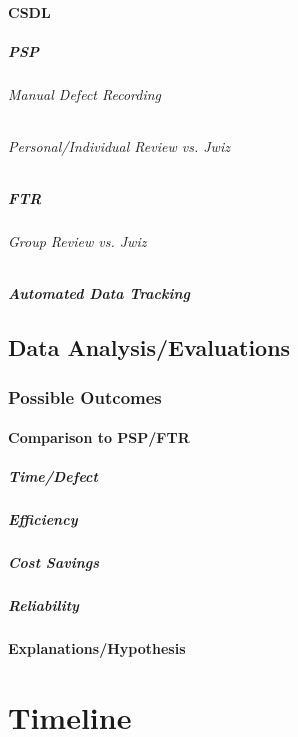 \subsubsection{CSDL}
\paragraph{PSP}
\subparagraph{Manual Defect Recording} \subparagraph{Personal/Individual
  Review vs. Jwiz}
\paragraph{FTR}
\subparagraph{Group Review vs. Jwiz}
\paragraph{Automated Data Tracking}

\section{Data Analysis/Evaluations}
\subsection{Possible Outcomes}
\subsubsection{Comparison to PSP/FTR}
\paragraph{Time/Defect}
\paragraph{Efficiency}
\paragraph{Cost Savings}
\paragraph{Reliability}
\subsubsection{Explanations/Hypothesis}

\chapter{Timeline}
